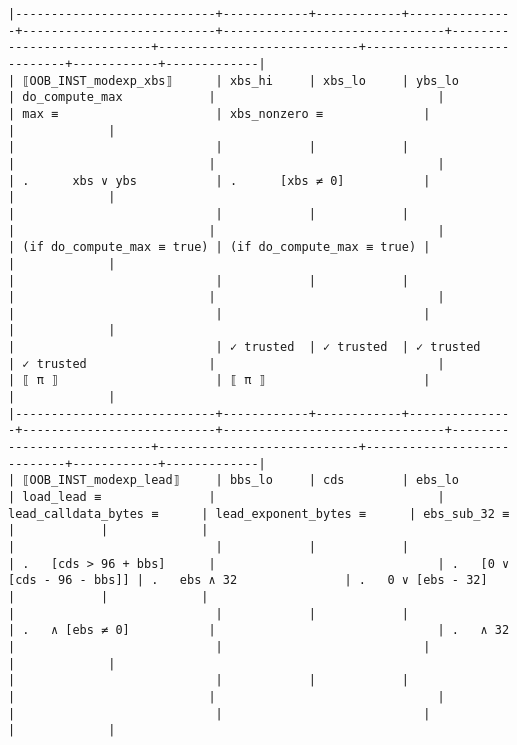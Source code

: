 \documentclass[varwidth=\maxdimen,margin=0.5cm,multi={verbatim}]{standalone}
\begin{document}
\begin{verbatim}
|----------------------------+------------+------------+---------------+---------------------------+-------------------------------+----------------------------+----------------------------+----------------------------+------------+-------------|
| ⟦OOB_INST_modexp_xbs⟧      | xbs_hi     | xbs_lo     | ybs_lo        | do_compute_max            |                               |                            | max ≡                      | xbs_nonzero ≡              |            |             |
|                            |            |            |               |                           |                               |                            | .      xbs ∨ ybs           | .      [xbs ≠ 0]           |            |             |
|                            |            |            |               |                           |                               |                            | (if do_compute_max ≡ true) | (if do_compute_max ≡ true) |            |             |
|                            |            |            |               |                           |                               |                            |                            |                            |            |             |
|                            | ✓ trusted  | ✓ trusted  | ✓ trusted     | ✓ trusted                 |                               |                            | ⟦ π ⟧                      | ⟦ π ⟧                      |            |             |
|----------------------------+------------+------------+---------------+---------------------------+-------------------------------+----------------------------+----------------------------+----------------------------+------------+-------------|
| ⟦OOB_INST_modexp_lead⟧     | bbs_lo     | cds        | ebs_lo        | load_lead ≡               |                               | lead_calldata_bytes ≡      | lead_exponent_bytes ≡      | ebs_sub_32 ≡               |            |             |
|                            |            |            |               | .   [cds > 96 + bbs]      |                               | .   [0 ∨ [cds - 96 - bbs]] | .   ebs ∧ 32               | .   0 ∨ [ebs - 32]         |            |             |
|                            |            |            |               | .   ∧ [ebs ≠ 0]           |                               | .   ∧ 32                   |                            |                            |            |             |
|                            |            |            |               |                           |                               |                            |                            |                            |            |             |

\end{verbatim}
\end{document}
